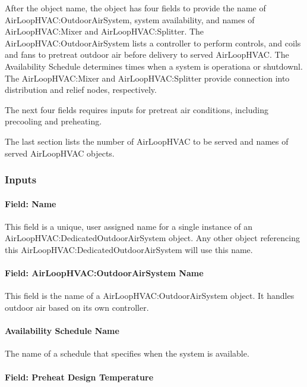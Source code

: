 After the object name, the object has four fields to provide the name of AirLoopHVAC:OutdoorAirSystem, system availability, and names of AirLoopHVAC:Mixer and AirLoopHVAC:Splitter. The AirLoopHVAC:OutdoorAirSystem lists a controller to perform controls, and coils and fans to pretreat outdoor air before delivery to served AirLoopHVAC. The Availability Schedule determines times when a system is operationa or shutdownl. The AirLoopHVAC:Mixer and AirLoopHVAC:Splitter provide connection into distribution and relief nodes, respectively.

The next four fields requires inputs for pretreat air conditions, including precooling and preheating.

The last section lists the number of AirLoopHVAC to be served and names of served AirLoopHVAC objects.

\subsubsection{Inputs}

\paragraph{Field: Name}

This field is a unique, user assigned name for a single instance of an AirLoopHVAC:DedicatedOutdoorAirSystem object. Any other object referencing this AirLoopHVAC:DedicatedOutdoorAirSystem will use this name.

\paragraph{Field: AirLoopHVAC:OutdoorAirSystem Name}\label{field-airLoophvac-outdoorairsystem-name}

This field is the name of a AirLoopHVAC:OutdoorAirSystem object. It handles outdoor air based on its own controller.

\paragraph{Availability Schedule Name}\label{availability-schedule-name}

The name of a schedule that specifies when the system is available.

\paragraph{Field: Preheat Design Temperature}

